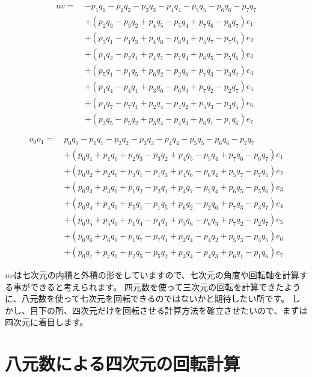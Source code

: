 \documentclass[a4paper,12pt,notitlepage]{jsreport}
\begin{document}
\begin{equation}
\begin{split}
uv=~&-p_1q_1-p_2q_2-p_3q_3-p_4q_4-p_5q_5-p_6q_6-p_7q_7\\
&+(p_2q_3-p_3q_2+p_4q_5-p_5q_4+p_7q_6-p_6q_7)e_1\\
&+(p_3q_1-p_1q_3+p_4q_6-p_6q_4+p_5q_7-p_7q_5)e_2\\
&+(p_1q_2-p_2q_1+p_4q_7-p_7q_4+p_6q_5-p_5q_6)e_3\\
&+(p_5q_1-p_1q_5+p_6q_2-p_2q_6+p_7q_3-p_3q_7)e_4\\
&+(p_1q_4-p_4q_1+p_3q_6-p_6q_3+p_7q_2-p_2q_7)e_5\\
&+(p_1q_7-p_7q_1+p_2q_4-p_4q_2+p_5q_3-p_3q_5)e_6\\
&+(p_2q_5-p_5q_2+p_3q_4-p_4q_3+p_6q_1-p_1q_6)e_7
\end{split}
\end{equation}

\begin{equation}
\begin{split}
o_0o_1=~&p_0q_0-p_1q_1-p_2q_2-p_3q_3-p_4q_4-p_5q_5-p_6q_6-p_7q_7\\
&+(p_0q_1+p_1q_0+p_2q_3-p_3q_2+p_4q_5-p_5q_4+p_7q_6-p_6q_7)e_1\\
&+(p_0q_2+p_2q_0+p_3q_1-p_1q_3+p_4q_6-p_6q_4+p_5q_7-p_7q_5)e_2\\
&+(p_0q_3+p_3q_0+p_1q_2-p_2q_1+p_4q_7-p_7q_4+p_6q_5-p_5q_6)e_3\\
&+(p_0q_4+p_4q_0+p_5q_1-p_1q_5+p_6q_2-p_2q_6+p_7q_3-p_3q_7)e_4\\
&+(p_0q_5+p_5q_0+p_1q_4-p_4q_1+p_3q_6-p_6q_3+p_7q_2-p_2q_7)e_5\\
&+(p_0q_6+p_6q_0+p_1q_7-p_7q_1+p_2q_4-p_4q_2+p_5q_3-p_3q_5)e_6\\
&+(p_0q_7+p_7q_0+p_2q_5-p_5q_2+p_3q_4-p_4q_3+p_6q_1-p_1q_6)e_7
\end{split}
\end{equation}

$uv$は七次元の内積と外積の形をしていますので、七次元の角度や回転軸を計算する事ができると考えられます。
四元数を使って三次元の回転を計算できたように、八元数を使って七次元を回転できるのではないかと期待したい所です。
しかし、目下の所、四次元だけを回転させる計算方法を確立させたいので、まずは四次元に着目します。

\section{八元数による四次元の回転計算}
\end{document}
